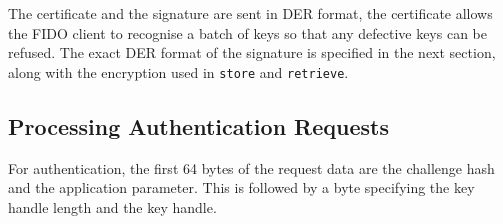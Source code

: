 \documentclass[acmtog,review]{acmart}
\begin{document}

The certificate and the signature are sent in DER format, the certificate allows the FIDO client to recognise a batch of keys
so that any defective keys can be refused. The exact DER format of the signature is specified in the next section, along with the encryption used in \texttt{store} and \texttt{retrieve}.


\subsection{Processing Authentication Requests}

For authentication, the first 64 bytes of the request data are the challenge hash and the application parameter. This is followed by a byte specifying the key handle length and the key handle.
\end{document}
